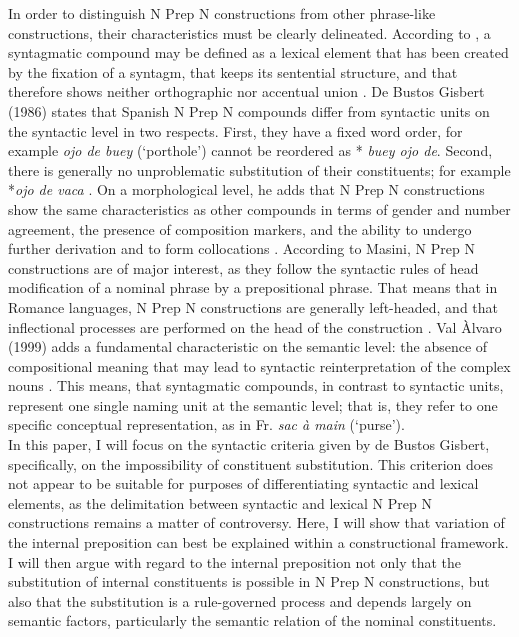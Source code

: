 \documentclass[output=paper]{langsci/langscibook}
\begin{document}
In order to distinguish N Prep N constructions from other phrase-like constructions, their characteristics must be clearly delineated. According to \citet{BuenafuentesdelaMata:2010}, a syntagmatic compound may be defined as a lexical element that has been created by the fixation of a syntagm, that keeps its sentential structure, and that therefore shows neither orthographic nor accentual union \citep[21ff.]{BuenafuentesdelaMata:2010}. De Bustos Gisbert (1986) states that Spanish N Prep N compounds differ from syntactic units on the syntactic level in two respects. First, they have a fixed word order, for example \textit{ojo de buey} (`porthole') cannot be reordered as * \textit {buey ojo de}. Second, there is generally no unproblematic substitution of their constituents; for example *\textit{ojo de vaca} \citep[4825]{ValAlvaro:1999}. On a morphological level, he adds that N Prep N constructions show the same characteristics as other compounds in terms of gender and number agreement, the presence of composition markers, and the ability to undergo further derivation and to form collocations \citep[77]{BustosGisbert:1986}. According to Masini, N Prep N constructions are of major interest, as they follow the syntactic rules of head modification of a nominal phrase by a prepositional phrase. That means that in Romance languages, N Prep N constructions are generally left-headed, and that inflectional processes are performed on the head of the construction \citep [257]{Masini:2009}. Val Àlvaro (1999) adds a fundamental characteristic on the semantic level: the absence of compositional meaning that may lead to syntactic reinterpretation of the complex nouns \citep[4827]{ValAlvaro:1999}. This means, that syntagmatic compounds, in contrast to syntactic units, represent one single naming unit at the semantic level; that is, they refer to one specific conceptual representation, as in Fr. \textit{sac à main} (`purse').\\

In this paper, I will focus on the syntactic criteria given by de Bustos Gisbert, specifically, on the impossibility of constituent substitution. This criterion does not appear to be suitable for purposes of differentiating syntactic and lexical elements, as the delimitation between syntactic and lexical N Prep N constructions remains a matter of controversy. Here, I will show that variation of the internal preposition can best be explained within a constructional framework. I will then argue with regard to the internal preposition not only that the substitution of internal constituents is possible in N Prep N constructions, but also that the substitution is a rule-governed process and depends largely on semantic factors, particularly the semantic relation of the nominal constituents.\\
\end{document}
